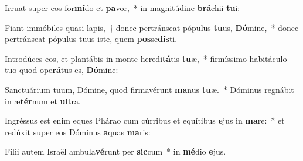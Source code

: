 \item Irruat super eos for\textbf{mí}do et \textbf{pa}vor,~* in magnitúdine \textbf{brá}chii \textbf{tu}i:
\item Fiant immóbiles quasi lapis,~† donec pertránseat pópulus \textbf{tu}us, \textbf{Dó}mine,~* donec pertránseat pópulus tuus iste, quem \textbf{pos}se\textbf{dís}ti.
\item Introdúces eos, et plantábis in monte heredi\textbf{tá}tis \textbf{tu}æ,~* firmíssimo habitáculo tuo quod ope\textbf{rá}tus es, \textbf{Dó}mine:
\item Sanctuárium tuum, Dómine, quod firmavérunt \textbf{ma}nus \textbf{tu}æ.~* Dóminus regnábit in æ\textbf{tér}num et \textbf{ul}tra.
\item Ingréssus est enim eques Phárao cum cúrribus et equítibus \textbf{e}jus in \textbf{ma}re:~* et redúxit super eos Dóminus \textbf{a}quas \textbf{ma}ris:
\item Fílii autem Israël ambula\textbf{vé}runt per \textbf{sic}cum~* in \textbf{mé}dio \textbf{e}jus.
